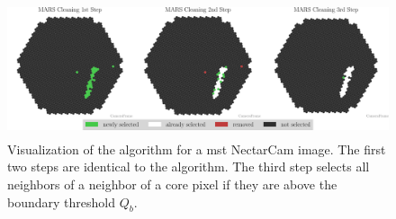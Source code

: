 \begin{figure}
    \centering
    \includegraphics[height=4cm]{plots/cleaner_steps/mars.pdf}
    \caption{Visualization of the \mars{} algorithm for a \gls{mst} NectarCam image. The first two
    steps are identical to the \tailcuts{} algorithm. The third step selects all neighbors of a neighbor of a
    core pixel if they are above the boundary threshold \(Q_b\).}%
    \label{fig:mars_cleaning}
\end{figure}

